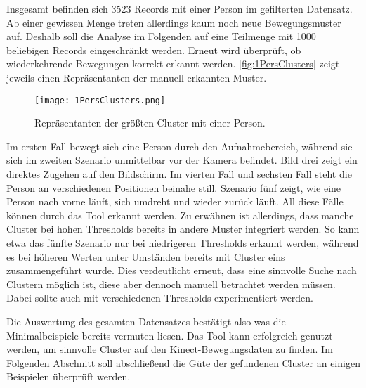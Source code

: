 Insgesamt befinden sich 3523 Records mit einer Person im gefilterten Datensatz.
Ab einer gewissen Menge treten allerdings kaum noch neue Bewegungsmuster auf.
Deshalb soll die Analyse im Folgenden auf eine Teilmenge mit 1000 beliebigen Records eingeschränkt werden.
Erneut wird überprüft, ob wiederkehrende Bewegungen korrekt erkannt werden.
\autoref{fig:1PersClusters} zeigt jeweils einen Repräsentanten der manuell erkannten Muster.
\begin{figure}[ht]
    \begin{center}
    \texttt{[image: 1PersClusters.png]}
    \end{center}
    \caption{Repräsentanten der größten Cluster mit einer Person.}
    \label{fig:1PersClusters}
\end{figure}
Im ersten Fall bewegt sich eine Person durch den Aufnahmebereich,
während sie sich im zweiten Szenario unmittelbar vor der Kamera befindet.
Bild drei zeigt ein direktes Zugehen auf den Bildschirm.
Im vierten Fall und sechsten Fall steht die Person an verschiedenen Positionen beinahe still.
Szenario fünf zeigt, wie eine Person nach vorne läuft,
sich umdreht und wieder zurück läuft.
All diese Fälle können durch das Tool erkannt werden.
Zu erwähnen ist allerdings, dass manche Cluster bei hohen Thresholds bereits in andere Muster integriert werden.
So kann etwa das fünfte Szenario nur bei niedrigeren Thresholds erkannt werden,
während es bei höheren Werten unter Umständen bereits mit Cluster eins zusammengeführt wurde.
Dies verdeutlicht erneut, dass eine sinnvolle Suche nach Clustern möglich ist,
diese aber dennoch manuell betrachtet werden müssen.
Dabei sollte auch mit verschiedenen Thresholds experimentiert werden.

Die Auswertung des gesamten Datensatzes bestätigt also was die Minimalbeispiele bereits vermuten liesen.
Das Tool kann erfolgreich genutzt werden, um sinnvolle Cluster auf den Kinect-Bewegungsdaten zu finden.
Im Folgenden Abschnitt soll abschließend die Güte der gefundenen Cluster an einigen Beispielen
überprüft werden.

